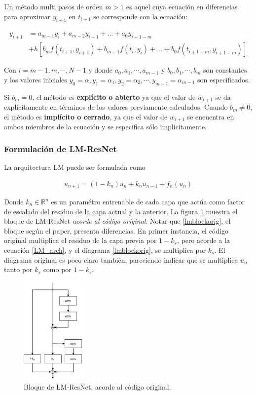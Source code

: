 \documentclass[titlepage,a4paper,oneside]{article}
\begin{document}
Un método multi pasos de orden $m > 1$ es aquel cuya ecuación en diferencias para aproximar $y_{i+1}$ en $t_{i+1}$ se corresponde con la ecuación:

\begin{align}
	y_{i+1} &= a_{m-1} y_i + a_{m-2} y_{i-1} + \ldots + a_0 y_{i+1-m} \\
	        &+ h \left[b_m f(t_{i+1}, y_{i+1}) + b_{m-1} f(t_i, y_i) + \ldots + b_0 f(t_{i+1-m}, y_{i+1-m})  \right]
\end{align}

Con $i=m-1, m, \cdots, N-1$ y donde $a_0, a_1, \cdots, a_{m-1}$ y $b_0, b_1, \cdots, b_m$ son constantes y los valores iniciales $y_0 = \alpha, y_1 = \alpha_1, y_2 = \alpha_2, \cdots, y_{m-1} = \alpha_{m-1}$ son especificados.

Si $b_m = 0$, el método es \textbf{explícito o abierto} ya que el valor de $w_{i+1}$ se da explícitamente en términos de los valores previamente calculados. Cuando $b_m \neq 0$, el método es \textbf{implícito o cerrado}, ya que el valor de $w_{i+1}$ se encuentra en ambos miembros de la ecuación y se especifica sólo implicitamente.

\subsubsection{Formulación de LM-ResNet}
La arquitectura LM puede ser formulada como

\begin{align}\label{LM_arch}
	u_{n+1} = (1-k_n) u_n + k_n u_{n-1} + f_n(u_n)
\end{align}

Donde $k_n \in \mathbb{R}^n$ es un paramétro entrenable de cada capa que actúa como factor de escalado del residuo de la capa actual y la anterior. La figura \ref{lmblock} muestra el bloque de LM-ResNet \textit{acorde al código original}. Notar que \ref{lmblockorig}, el bloque según el paper, presenta diferencias. En primer instancia, el código original multiplica el residuo de la capa previa por $1-k_s$, pero acorde a la ecuación \ref{LM_arch}, y el diagrama \ref{lmblockorig}, se multiplica por $k_s$. El diagrama original es poco claro también, pareciendo indicar que se multiplica $u_n$ tanto por $k_s$ como por $1-k_s$.

\begin{figure}[H]
\centering
\includegraphics[height=200px]{images/LM-Block.png}
\caption{Bloque de LM-ResNet, acorde al código original.}
\label{lmblock}
\end{figure}
\end{document}
